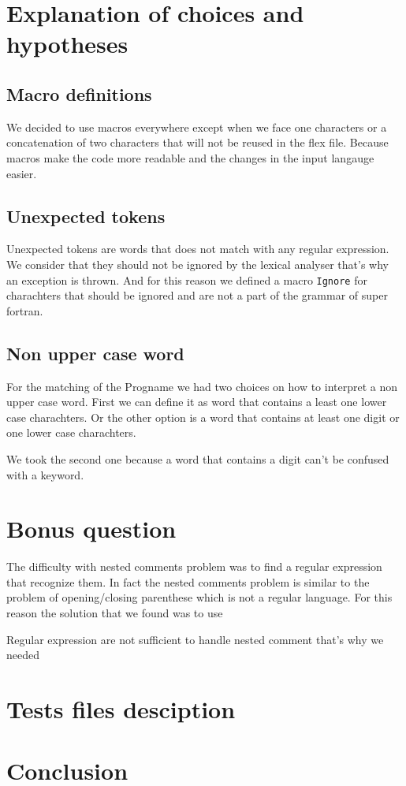 \documentclass[12pt]{article}
\begin{document}
\section{Explanation of choices and hypotheses}

\subsection{Macro definitions}
We decided to use macros everywhere except when we face one characters or a concatenation of two characters
that will not be reused in the flex file. Because macros make the code more readable and the changes 
in the input langauge easier.

\subsection{Unexpected tokens}
Unexpected tokens are words that does not match with any regular expression. We consider that they
should not be ignored by the lexical analyser that's why an exception is thrown. And for this reason
we defined a macro \texttt{Ignore} for charachters that should be ignored and are not a part of 
the grammar of super fortran.

\subsection{Non upper case word}
For the matching of the Progname we had two choices on how to interpret a non upper case word.
First we can define it as word that contains a least one lower case charachters. Or the other option
is a word that contains at least one digit or one lower case charachters.

We took the second one because a word that contains a digit can't be confused with a keyword.



\section{Bonus question}
The difficulty with nested comments problem was to find a regular expression that recognize them.
In fact the nested comments problem is similar to the problem of opening/closing parenthese which is not a 
regular language. For this reason the solution that we found was to use

Regular expression are not sufficient to handle nested comment that's why we needed 

\section{Tests files desciption}


\section{Conclusion}
\end{document}
